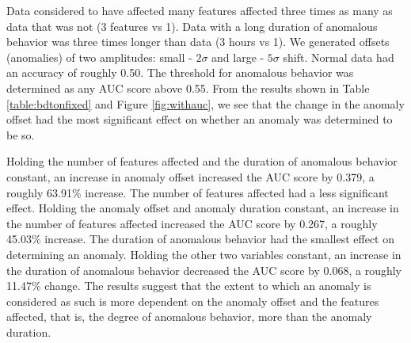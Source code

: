 \documentclass[5p]{elsarticle}
\begin{document}
Data considered to have affected many features affected three times as many as data that was not (3 features vs 1). Data with a long duration of anomalous behavior was three times longer than data (3 hours vs 1). We generated offsets (anomalies) of two amplitudes: small - $2\sigma$ and large - $5\sigma$ shift. Normal data had an accuracy of roughly 0.50. The threshold for anomalous behavior was determined as any AUC score above 0.55. From the results shown in Table \ref{table:bdtonfixed} and Figure \ref{fig:withauc}, we see that the change in the anomaly offset had the most significant effect on whether an anomaly was determined to be so.

Holding the number of features affected and the duration of anomalous behavior constant, an increase in anomaly offset increased the AUC score by 0.379, a roughly 63.91\% increase. The number of features affected had a less significant effect. Holding the anomaly offset and anomaly duration constant, an increase in the number of features affected increased the AUC score by 0.267, a roughly 45.03\% increase. The duration of anomalous behavior had the smallest effect on determining an anomaly. Holding the other two variables constant, an increase in the duration of anomalous behavior decreased the AUC score by 0.068, a roughly 11.47\% change. The results suggest that the extent to which an anomaly is considered as such is more dependent on the anomaly offset and the features affected, that is, the degree of anomalous behavior, more than the anomaly duration.
\end{document}

